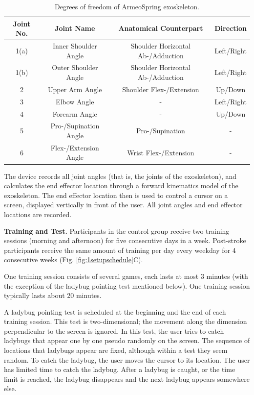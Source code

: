 \begin{table}
	\begin{tabular}{c c c c}
		\hline
		Joint No. & Joint Name & Anatomical Counterpart & Direction \\
		\hline
		1(a) & Inner Shoulder Angle & Shoulder Horizontal Ab-/Adduction & Left/Right \\
		1(b) & Outer Shoulder Angle & Shoulder Horizontal Ab-/Adduction & Left/Right \\
		2 & Upper Arm Angle & Shoulder Flex-/Extension & Up/Down \\
		3 & Elbow Angle & - & Left/Right \\
		4 & Forearm Angle & - & Up/Down \\
		5 & Pro-/Supination Angle & Pro-/Supination & - \\ 
		6 & Flex-/Extension Angle & Wrist Flex-/Extension & - \\
		\hline
	\end{tabular}
	\caption{Degrees of freedom of ArmeoSpring exoskeleton.}
	\label{tab:devicedof}
\end{table}

The device records all joint angles (that is, the joints of the exoskeleton), and calculates the end effector location through a forward kinematics model of the exoskeleton. 
The end effector location then is used to control a cursor on a screen, displayed vertically in front of the user. 
All joint angles and end effector locations are recorded.

\textbf{Training and Test.}
Participants in the control group receive two training sessions (morning and afternoon) for five consecutive days in a week.
Post-stroke participants receive the same amount of training per day every weekday for 4 consecutive weeks (Fig. \ref{fig:1setupschedule}C).

One training session consists of several games, each lasts at most 3 minutes (with the exception of the ladybug pointing test mentioned below).
One training session typically lasts about 20 minutes.

A ladybug pointing test is scheduled at the beginning and the end of each training session. 
This test is two-dimensional; the movement along the dimension perpendicular to the screen is ignored. 
In this test, the user tries to catch ladybugs that appear one by one pseudo randomly on the screen. 
The sequence of locations that ladybugs appear are fixed, although within a test they seem random.
To catch the ladybug, the user moves the cursor to its location. 
The user has limited time to catch the ladybug.
After a ladybug is caught, or the time limit is reached, the ladybug disappears and the next ladybug appears somewhere else. 

